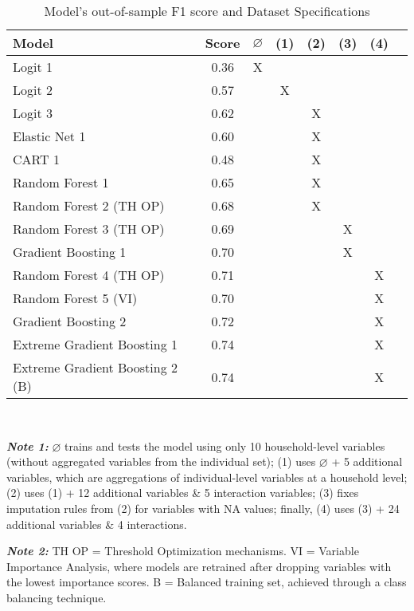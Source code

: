 \documentclass[12pt,a4paper,onecolumn]{article}
\begin{document}
\begin{table}[h!]
\footnotesize
\caption{Model's out-of-sample F1 score and Dataset Specifications} 
\centering
\begin{tabular}{l c c c c c c c}
\hline
\textbf{Model} & \textbf{Score} & $\varnothing$ & (1) & (2) & (3) & (4)  \\
\hline
Logit 1 & 0.36 & X &   &   &   &     \\
Logit 2 & 0.57 &   & X &   &   &     \\
Logit 3 & 0.62 &   &   & X &   &     \\
Elastic Net  1    & 0.60 &   &   &  X &  &     \\
CART 1   & 0.48 &   &  & X  &   &     \\
Random Forest 1    & 0.65 &   &  &  X &   &     \\
Random Forest 2 (TH OP) & 0.68 &   &   & X &   &   \\
Random Forest 3 (TH OP) & 0.69 &   &   &   & X &   \\
Gradient Boosting 1    & 0.70 &   &   &   & X &    \\
Random Forest 4 (TH OP) & 0.71 &   &   &   &  & X    \\
Random Forest 5 (VI) & 0.70 &   &   &   &  & X    \\
Gradient Boosting 2    & 0.72 &   &   &   &   & X \\
Extreme Gradient Boosting 1    & 0.74 &   &   &   &   & X \\
Extreme Gradient Boosting 2 (B)    & 0.74 &   &   &   &   & X \\

\hline
\end{tabular}
\vspace{0.5em}
\\
\small{\parbox{\linewidth}{%
\textit{\textbf{Note 1:}} $\varnothing$ trains and tests the model using only 10 household-level variables (without aggregated variables from the individual set); (1) uses $\varnothing$ + 5 additional variables, which are aggregations of individual-level variables at a household level; (2) uses (1) + 12 additional variables \& 5 interaction variables; (3) fixes imputation rules from (2) for variables with NA values; finally, (4) uses (3) + 24 additional variables \& 4 interactions.%

\textit{\textbf{Note 2:}} TH OP = Threshold Optimization mechanisms. VI = Variable Importance Analysis, where models are retrained after dropping variables with the lowest importance scores. B = Balanced training set, achieved through a class balancing technique.%

}}
\end{table}
\end{document}
